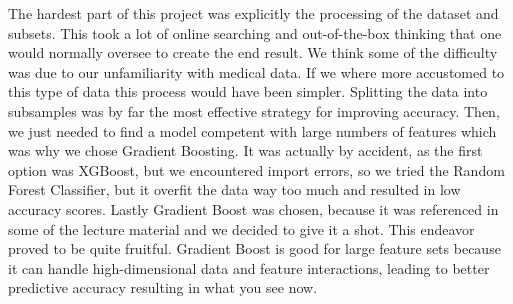 \documentclass{article}
\begin{document}
The hardest part of this project was explicitly the processing of the dataset and subsets. This took a lot of online searching and out-of-the-box thinking that one would normally oversee to create the end result. We think some of the difficulty was due to our unfamiliarity with medical data. If we where more accustomed to this type of data this process would have been simpler. Splitting the data into subsamples was by far the most effective strategy for improving accuracy. Then, we just needed to find a model competent with large numbers of features which was why we chose Gradient Boosting. It was actually by accident, as the first option was XGBoost, but we encountered import errors, so we tried the Random Forest Classifier, but it overfit the data way too much and resulted in low accuracy scores. Lastly Gradient Boost was chosen, because it was referenced in some of the lecture material and we decided to give it a shot. This endeavor proved to be quite fruitful. Gradient Boost is good for large feature sets because it can handle high-dimensional data and feature interactions, leading to better predictive accuracy resulting in what you see now. 
\end{document}
